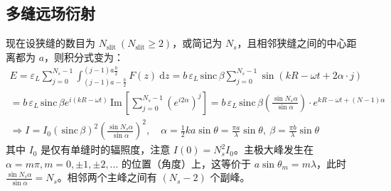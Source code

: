 \documentclass[UTF8]{report}
\def\Im{\mathrm{\,Im}\,}
\def\sinc{\mathrm{\,sinc}\,}
\theoremstyle{MyLineTheoremStyle} %
\theoremstyle{MyBlockTheoremStyle} %
\theoremstyle{MySubsubsectionStyle} %
\begin{document}
\subsection{多缝远场衍射}

现在设狭缝的数目为 $N_{\text{slit}} \ (N_{\text{slit}} \geqslant 2)$，或简记为 $N_s$，且相邻狭缝之间的中心距离都为 $a$，则积分式变为：
\begin{gather}
E = \varepsilon_L \sum_{j=0}^{N_s-1} \int_{(j-1)a-\frac{b}{2}}^{(j-1)a\frac{b}{2}} F(z) \ \mathrm{d}z = b \,\varepsilon_L  \sinc \beta \sum_{j=0}^{N_s-1}\sin (kR - \omega t + 2\alpha \cdot j) \\ 
= b \,\varepsilon_L  \sinc \beta e^{i(kR - \omega t)}  \Im \left[ \sum_{j=0}^{N_s-1} \left(e^{i2\alpha}\right)^j \right]
=  b \,\varepsilon_L  \sinc \beta \left(\frac{\sin N_s \alpha}{\sin \alpha}\right) \cdot e^{kR - \omega t + (N-1)\alpha} \\ 
\Longrightarrow I = I_0 \left( \sinc \beta\right)^2 \left(\frac{\sin N_s \alpha}{\sin \alpha}\right)^2
,\quad \alpha = \frac{1}{2}k a \sin \theta = \frac{\pi a}{\lambda} \sin \theta,\ \beta = \frac{\pi b}{\lambda} \sin \theta
\end{gather}
其中 $I_0$ 是仅有单缝时的辐照度，注意 $I(0) = N_s^2I_0$。主极大峰发生在 $\alpha = m\pi, m = 0, \pm 1, \pm 2, ...$ 的位置（角度）上，这等价于 $a \sin \theta_m = m \lambda$，此时 $\frac{\sin N_s \alpha}{\sin \alpha} = N_s$。相邻两个主峰之间有 $(N_s - 2)$ 个副峰。
\end{document}

